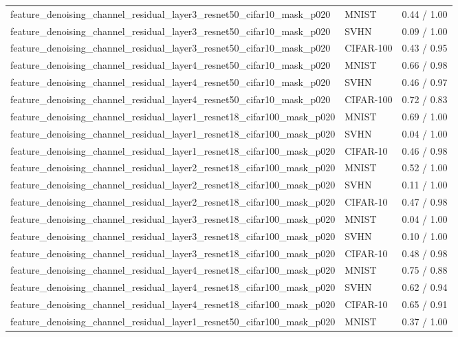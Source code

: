 \begin{tabular}{lll}
feature\_denoising\_channel\_residual\_layer3\_resnet50\_cifar10\_mask\_p020 & MNIST & 0.44 / 1.00 \\
feature\_denoising\_channel\_residual\_layer3\_resnet50\_cifar10\_mask\_p020 & SVHN & 0.09 / 1.00 \\
feature\_denoising\_channel\_residual\_layer3\_resnet50\_cifar10\_mask\_p020 & CIFAR-100 & 0.43 / 0.95 \\
feature\_denoising\_channel\_residual\_layer4\_resnet50\_cifar10\_mask\_p020 & MNIST & 0.66 / 0.98 \\
feature\_denoising\_channel\_residual\_layer4\_resnet50\_cifar10\_mask\_p020 & SVHN & 0.46 / 0.97 \\
feature\_denoising\_channel\_residual\_layer4\_resnet50\_cifar10\_mask\_p020 & CIFAR-100 & 0.72 / 0.83 \\
feature\_denoising\_channel\_residual\_layer1\_resnet18\_cifar100\_mask\_p020 & MNIST & 0.69 / 1.00 \\
feature\_denoising\_channel\_residual\_layer1\_resnet18\_cifar100\_mask\_p020 & SVHN & 0.04 / 1.00 \\
feature\_denoising\_channel\_residual\_layer1\_resnet18\_cifar100\_mask\_p020 & CIFAR-10 & 0.46 / 0.98 \\
feature\_denoising\_channel\_residual\_layer2\_resnet18\_cifar100\_mask\_p020 & MNIST & 0.52 / 1.00 \\
feature\_denoising\_channel\_residual\_layer2\_resnet18\_cifar100\_mask\_p020 & SVHN & 0.11 / 1.00 \\
feature\_denoising\_channel\_residual\_layer2\_resnet18\_cifar100\_mask\_p020 & CIFAR-10 & 0.47 / 0.98 \\
feature\_denoising\_channel\_residual\_layer3\_resnet18\_cifar100\_mask\_p020 & MNIST & 0.04 / 1.00 \\
feature\_denoising\_channel\_residual\_layer3\_resnet18\_cifar100\_mask\_p020 & SVHN & 0.10 / 1.00 \\
feature\_denoising\_channel\_residual\_layer3\_resnet18\_cifar100\_mask\_p020 & CIFAR-10 & 0.48 / 0.98 \\
feature\_denoising\_channel\_residual\_layer4\_resnet18\_cifar100\_mask\_p020 & MNIST & 0.75 / 0.88 \\
feature\_denoising\_channel\_residual\_layer4\_resnet18\_cifar100\_mask\_p020 & SVHN & 0.62 / 0.94 \\
feature\_denoising\_channel\_residual\_layer4\_resnet18\_cifar100\_mask\_p020 & CIFAR-10 & 0.65 / 0.91 \\
feature\_denoising\_channel\_residual\_layer1\_resnet50\_cifar100\_mask\_p020 & MNIST & 0.37 / 1.00 \\

\end{tabular}
